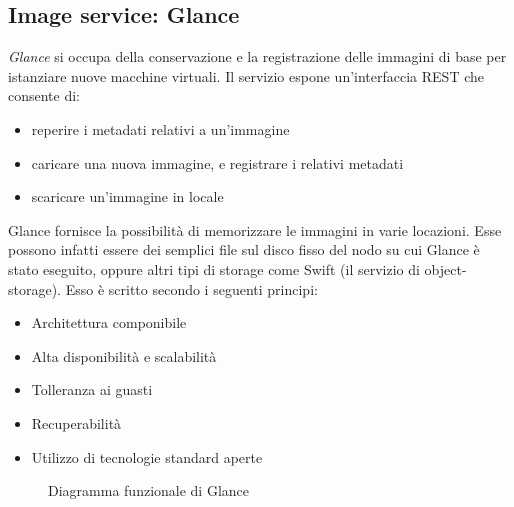 \subsection{Image service: Glance}
\textit{Glance} si occupa della conservazione e la registrazione delle immagini di base per istanziare nuove macchine virtuali.
Il servizio espone un'interfaccia REST che consente di:
\begin{itemize}
\item reperire i metadati relativi a un'immagine
\item caricare una nuova immagine, e registrare i relativi metadati
\item scaricare un'immagine in locale
\end{itemize}
Glance fornisce la possibilità di memorizzare le immagini in varie locazioni. Esse possono infatti essere dei semplici file sul disco fisso del nodo su cui Glance è stato eseguito, oppure altri tipi di storage come Swift (il servizio di object-storage).
Esso è scritto secondo i seguenti principi:
\begin{itemize}
\item Architettura componibile
\item Alta disponibilità e scalabilità
\item Tolleranza ai guasti
\item Recuperabilità
\item Utilizzo di tecnologie standard aperte
\end{itemize}
\begin{figure}[H]
\centering
{}
\caption{Diagramma funzionale di Glance\cite{openstackglance}}\label{openstackglance}
\end{figure}



